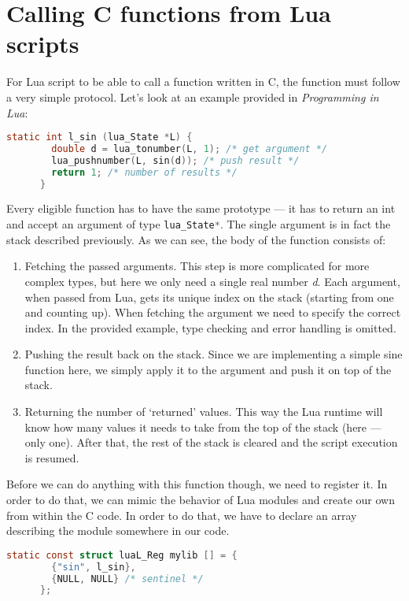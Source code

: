\documentclass[polish, english]{iithesis}
\begin{document}
  \section{Calling C functions from Lua scripts}\label{call_c_from_lua}
    For Lua script to be able to call a function written in C, the function must follow a very simple protocol.
    Let's look at an example provided in \textit{Programming in Lua}\cite{pil4}:
    \begin{lstlisting}[caption=Example C function to be called from Lua, language=C]
      static int l_sin (lua_State *L) {
        double d = lua_tonumber(L, 1); /* get argument */
        lua_pushnumber(L, sin(d)); /* push result */
        return 1; /* number of results */
      }
    \end{lstlisting}
    Every eligible function has to have the same prototype --- it has to return an int and accept an argument of type \lstinline[language=C]|lua_State*|.
    The single argument is in fact the stack described previously.
    As we can see, the body of the function consists of:
    \begin{enumerate}
      \item Fetching the passed arguments. 
        This step is more complicated for more complex types, but here we only need a single real number \textit{d}.
        Each argument, when passed from Lua, gets its unique index on the stack (starting from one and counting up).
        When fetching the argument we need to specify the correct index.
        In the provided example, type checking and error handling is omitted.
      \item Pushing the result back on the stack.
        Since we are implementing a simple sine function here, we simply apply it to the argument and push it on top of the stack.
      \item Returning the number of `returned' values.
        This way the Lua runtime will know how many values it needs to take from the top of the stack (here --- only one).
        After that, the rest of the stack is cleared and the script execution is resumed.
    \end{enumerate}
    Before we can do anything with this function though, we need to register it.
    In order to do that, we can mimic the behavior of Lua modules and create our own from within the C code.
    In order to do that, we have to declare an array describing the module somewhere in our code.
    \begin{lstlisting}[language=C, caption=Module declaration]
      static const struct luaL_Reg mylib [] = {
        {"sin", l_sin},
        {NULL, NULL} /* sentinel */
      };
    \end{lstlisting}
\end{document}

